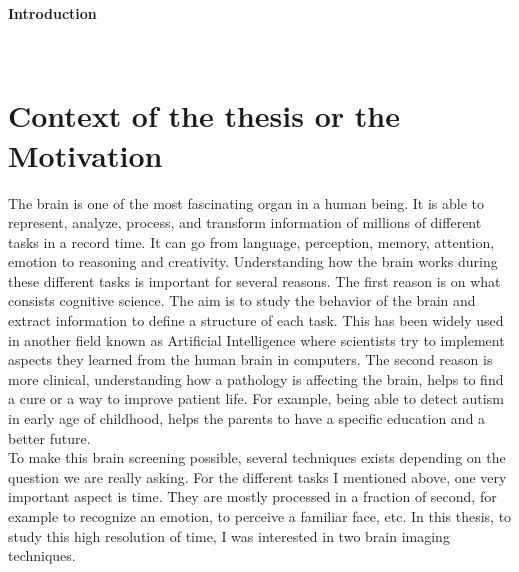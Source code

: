 

\newpage

{\huge\textbf{Introduction}\par}
\HRule \\[0.4cm] %
\section*{Context of the thesis or the Motivation}

The brain is one of the most fascinating organ in a human being. It is able to represent, analyze, process, and transform information of millions of different tasks in a record time. It can go from language, perception, memory, attention, emotion to reasoning and creativity. Understanding how the brain works during these different tasks is important for several reasons. The first reason is on what consists cognitive science. The aim is to study the behavior of the brain and extract information to define a structure of each task. This has been widely used in another field known as  Artificial Intelligence where scientists try to implement aspects they learned from the human brain in computers. The second reason is more clinical, understanding how a pathology is affecting the brain, helps to find a cure or a way to improve patient life. For example, being able to detect autism in early age of childhood, helps the parents to have a specific education and a better future.\\

To make this brain screening possible, several techniques exists depending on the question we are really asking. For the different tasks I mentioned above, one very important aspect is time. They are mostly processed in a fraction of second, for example to recognize an emotion, to perceive a familiar face, etc. In this thesis, to study this high resolution of time, I was interested in two brain imaging techniques.\\

